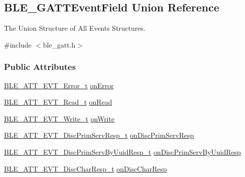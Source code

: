 \hypertarget{union_b_l_e___g_a_t_t_event_field}{}\subsection{B\+L\+E\+\_\+\+G\+A\+T\+T\+Event\+Field Union Reference}
\label{union_b_l_e___g_a_t_t_event_field}


The Union Structure of All Events Structures.  




{\ttfamily \#include $<$ble\+\_\+gatt.\+h$>$}

\subsubsection*{Public Attributes}
\begin{DoxyCompactItemize}
\item 
\hyperlink{struct_b_l_e___a_t_t___e_v_t___error__t}{B\+L\+E\+\_\+\+A\+T\+T\+\_\+\+E\+V\+T\+\_\+\+Error\+\_\+t} \hyperlink{union_b_l_e___g_a_t_t_event_field_a0e121ff3fd5754fc9cd04073a757bdd6}{on\+Error}
\item 
\hyperlink{struct_b_l_e___a_t_t___e_v_t___read__t}{B\+L\+E\+\_\+\+A\+T\+T\+\_\+\+E\+V\+T\+\_\+\+Read\+\_\+t} \hyperlink{union_b_l_e___g_a_t_t_event_field_a77a06f68002c55a3635c9bd45cd91ac2}{on\+Read}
\item 
\hyperlink{struct_b_l_e___a_t_t___e_v_t___write__t}{B\+L\+E\+\_\+\+A\+T\+T\+\_\+\+E\+V\+T\+\_\+\+Write\+\_\+t} \hyperlink{union_b_l_e___g_a_t_t_event_field_a05e881c9569e2462801533d01d0f66f0}{on\+Write}
\item 
\hyperlink{struct_b_l_e___a_t_t___e_v_t___disc_prim_serv_resp__t}{B\+L\+E\+\_\+\+A\+T\+T\+\_\+\+E\+V\+T\+\_\+\+Disc\+Prim\+Serv\+Resp\+\_\+t} \hyperlink{union_b_l_e___g_a_t_t_event_field_a865ad7c890f9719de2054b49005e7abc}{on\+Disc\+Prim\+Serv\+Resp}
\item 
\hyperlink{struct_b_l_e___a_t_t___e_v_t___disc_prim_serv_by_uuid_resp__t}{B\+L\+E\+\_\+\+A\+T\+T\+\_\+\+E\+V\+T\+\_\+\+Disc\+Prim\+Serv\+By\+Uuid\+Resp\+\_\+t} \hyperlink{union_b_l_e___g_a_t_t_event_field_af94a43c58207749c4abad23477f947b3}{on\+Disc\+Prim\+Serv\+By\+Uuid\+Resp}
\item 
\hyperlink{struct_b_l_e___a_t_t___e_v_t___disc_char_resp__t}{B\+L\+E\+\_\+\+A\+T\+T\+\_\+\+E\+V\+T\+\_\+\+Disc\+Char\+Resp\+\_\+t} \hyperlink{union_b_l_e___g_a_t_t_event_field_a5b66991a9903669265d921b52ae4545a}{on\+Disc\+Char\+Resp}
\item 

\end{DoxyCompactItemize}
